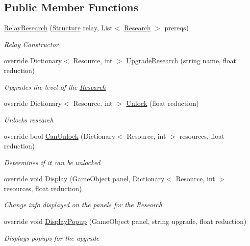 \subsection*{Public Member Functions}
\begin{DoxyCompactItemize}
\item 
\hyperlink{class_relay_research_a1f0e3d74e66752e2d22647fb85cd08c8}{Relay\+Research} (\hyperlink{class_structure}{Structure} relay, List$<$ \hyperlink{class_research}{Research} $>$ prereqs)
\begin{DoxyCompactList}\small\item\em Relay Constructor \end{DoxyCompactList}\item 
override Dictionary$<$ Resource, int $>$ \hyperlink{class_relay_research_a0262fccebce475efa4ab3d376b4a45ae}{Upgrade\+Research} (string name, float reduction)
\begin{DoxyCompactList}\small\item\em Upgrades the level of the \hyperlink{class_research}{Research} \end{DoxyCompactList}\item 
override Dictionary$<$ Resource, int $>$ \hyperlink{class_relay_research_a384b0d81a52c38523fa370f6ece80909}{Unlock} (float reduction)
\begin{DoxyCompactList}\small\item\em Unlocks research \end{DoxyCompactList}\item 
override bool \hyperlink{class_relay_research_aa7cbfc1ff3f4cfc244ba16bc62357b36}{Can\+Unlock} (Dictionary$<$ Resource, int $>$ resources, float reduction)
\begin{DoxyCompactList}\small\item\em Determines if it can be unlocked \end{DoxyCompactList}\item 
override void \hyperlink{class_relay_research_af891a7b31495e6c74a92f535a4941f48}{Display} (Game\+Object panel, Dictionary$<$ Resource, int $>$ resources, float reduction)
\begin{DoxyCompactList}\small\item\em Change info displayed on the panels for the \hyperlink{class_research}{Research} \end{DoxyCompactList}\item 
override void \hyperlink{class_relay_research_a336f93531b6182411330914ccf6718b5}{Display\+Popup} (Game\+Object panel, string upgrade, float reduction)
\begin{DoxyCompactList}\small\item\em Displays popups for the upgrade \end{DoxyCompactList}\end{DoxyCompactItemize}
